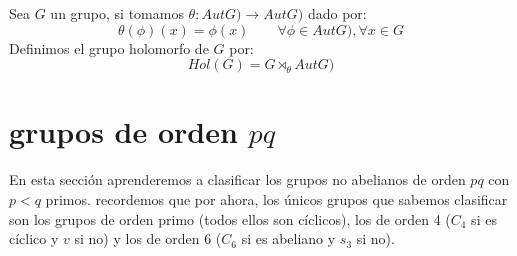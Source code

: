 \begin{definicion}
    Sea $G$ un grupo, si tomamos $\theta:AutG)\to AutG)$ dado por:
    \begin{equation*}
        \theta(\phi)(x) = \phi(x) \qquad \forall \phi \in AutG), \forall x\in G
    \end{equation*}
    Definimos el grupo holomorfo de $G$ por:
    \begin{equation*}
        Hol(G) = G\rtimes_\theta AutG)
    \end{equation*}
\end{definicion}

\section{grupos de orden $pq$}
\noindent
En esta sección aprenderemos a clasificar los grupos no abelianos de orden $pq$ con $p<q$ primos. recordemos que por ahora, los únicos grupos que sabemos clasificar son los grupos de orden primo (todos ellos son cíclicos), los de orden 4 ($C_4$ si es cíclico y $v$ si no) y los de orden 6 ($C_6$ si es abeliano y $s_3$ si no).\\

